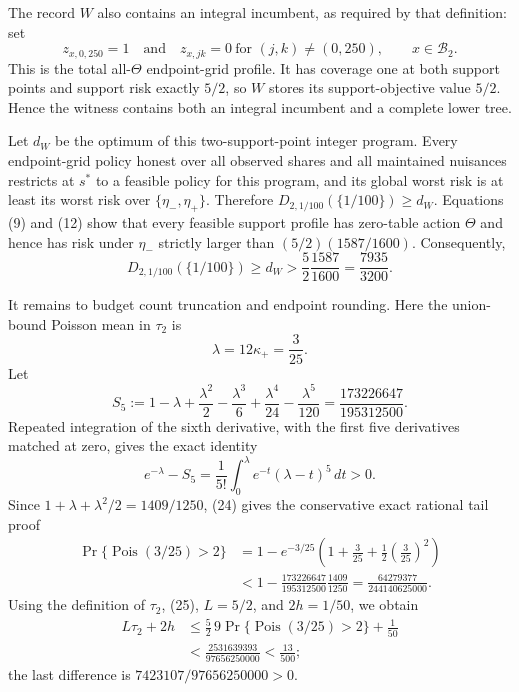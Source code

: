 The record \(W\) also contains an integral incumbent, as required by that definition: set
\[
 z_{x,0,250}=1
 \quad\text{and}\quad
 z_{x,jk}=0\ \text{for }(j,k)\ne(0,250),
 \qquad x\in\mathcal B_2.
\tag{22}
\]
This is the total all-\(\Theta\) endpoint-grid profile. It has coverage one at both support points and support risk exactly \(5/2\), so \(W\) stores its support-objective value \(5/2\). Hence the witness contains both an integral incumbent and a complete lower tree.

Let \(d_W\) be the optimum of this two-support-point integer program. Every endpoint-grid policy honest over all observed shares and all maintained nuisances restricts at \(s^*\) to a feasible policy for this program, and its global worst risk is at least its worst risk over \(\{\eta_-,\eta_+\}\). Therefore \(D_{2,1/100}(\{1/100\})\ge d_W\). Equations (9) and (12) show that every feasible support profile has zero-table action \(\Theta\) and hence has risk under \(\eta_-\) strictly larger than \((5/2)(1587/1600)\). Consequently,
\[
 D_{2,1/100}(\{1/100\})\ge d_W
 >\frac52\frac{1587}{1600}
 =\frac{7935}{3200}.
\tag{23}
\]

It remains to budget count truncation and endpoint rounding. Here the union-bound Poisson mean in \(\tau_2\) is
\[
 \lambda=12\kappa_+=\frac3{25}.
\]
Let
\[
 S_5:=1-\lambda+\frac{\lambda^2}{2}-\frac{\lambda^3}{6}
       +\frac{\lambda^4}{24}-\frac{\lambda^5}{120}
 =\frac{173226647}{195312500}.
\tag{24}
\]
Repeated integration of the sixth derivative, with the first five derivatives matched at zero, gives the exact identity
\[
 e^{-\lambda}-S_5
 =\frac1{5!}\int_0^\lambda e^{-t}(\lambda-t)^5\,dt>0.
\]
Since \(1+\lambda+\lambda^2/2=1409/1250\), (24) gives the conservative exact rational tail proof
\[
 \begin{aligned}
 \Pr\{\operatorname{Pois}(3/25)>2\}
 &=1-e^{-3/25}\left(1+\frac3{25}+\frac12\left(\frac3{25}\right)^2\right)\\
 &<1-\frac{173226647}{195312500}\frac{1409}{1250}
 =\frac{64279377}{244140625000}.
\end{aligned}
\tag{25}
\]
Using the definition of \(\tau_2\), (25), \(L=5/2\), and \(2h=1/50\), we obtain
\[
 \begin{aligned}
 L\tau_2+2h
 &\le \frac52\,9\Pr\{\operatorname{Pois}(3/25)>2\}+\frac1{50}\\
 &<\frac{2531639393}{97656250000}
 <\frac{13}{500};
\end{aligned}
\tag{26}
\]
the last difference is \(7423107/97656250000>0\).

